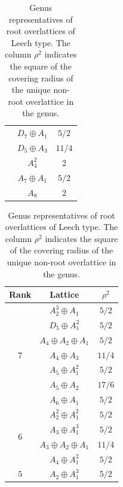 \documentclass[11pt,letterpaper]{amsart}
\begin{document}
\begin{table}[H]
\begin{tabular}{ c | c | c }
&$D_7\oplus A_1$ &$5/2$\\
&$D_5\oplus A_3$ &$11/4$\\
&$A_4^2$ &$2$\\
&$A_7\oplus A_1$ &$5/2$\\
&$A_8$ &$2$\\
\end{tabular}
\quad
\begin{tabular}{ c | c | c } 
  Rank & Lattice &$\rho^2$\\
  \hline
  \hline
\multirow{7}{1.5em}{$7$}
&$A_2^3\oplus A_1$ &$5/2$\\
&$D_5\oplus A_1^2$ &$5/2$\\
&$A_4\oplus A_2\oplus A_1$ &$5/2$\\
&$A_4\oplus A_3$ &$11/4$\\
&$A_5\oplus A_1^2$ &$5/2$\\
&$A_5\oplus A_2$ &$17/6$\\
&$A_6\oplus A_1$ &$5/2$\\
\hline
\multirow{4}{1.5em}{$6$}
&$A_2^2\oplus A_1^2$ &$5/2$\\
&$A_3\oplus A_1^3$ &$5/2$\\
&$A_3\oplus A_2\oplus A_1$ &$11/4$\\
&$A_4\oplus A_1^2$ &$5/2$\\
\hline
\multirow{1}{1.5em}{$5$}
&$A_2\oplus A_1^3$ &$5/2$\\
\end{tabular}
\caption{Genus representatives of root overlattices of Leech type. The column $\rho^2$ indicates the square of the covering radius of the unique non-root overlattice in the genus.}
\label{tab:root.overlattices.Leech.type}
\end{table}
\end{document}
